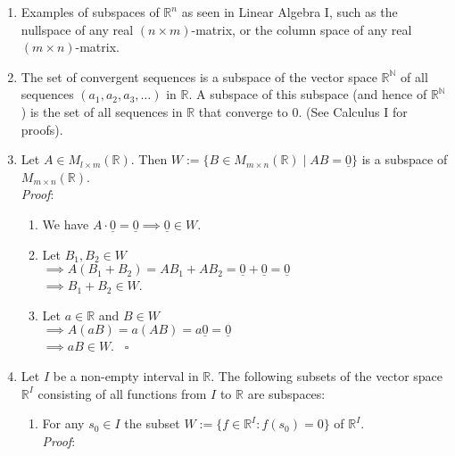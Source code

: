 \documentclass[
  12pt,
  a4paper,
  twoside]{article}
\providecommand{\tightlist}{%
  \setlength{\itemsep}{0pt}\setlength{\parskip}{0pt}}
\theoremstyle{plain}
\theoremstyle{definition}
\begin{document}
\begin{enumerate}
\def\labelenumi{(\alph{enumi})}
\item
  Examples of subspaces of \(\mathbb{R}^{n}\) as seen in Linear Algebra I, such as the nullspace of any real \((n \times m)\)-matrix, or the column space of any real \((m\times n)\)-matrix.
\item
  The set of convergent sequences is a subspace of the vector space \(\mathbb{R}^{\mathbb{N}}\) of all sequences \((a_{1},a_{2},a_{3}, \dots)\) in \(\mathbb{R}\). A subspace of this subspace (and hence of \(\mathbb{R}^{\mathbb{N}}\)) is the set of all sequences in \(\mathbb{R}\) that converge to \(0\). (See Calculus I for proofs).
\item
  Let \(A \in M_{l \times m}(\mathbb{R})\). Then \(W := \{B \in M_{m \times n}(\mathbb{R}) \mid AB = \underline{0} \}\) is a subspace of \(M_{m \times n}(\mathbb{R})\).\\
  \emph{Proof}:

  \begin{enumerate}
  \def\labelenumii{(\roman{enumii})}
  \tightlist
  \item
    We have \(A \cdot \underline{0} = \underline{0} \implies \underline{0} \in W\).
  \item
    Let \(B_{1},B_{2} \in W\)\\
    \(\implies A(B_{1} + B_{2}) = AB_{1} + AB_{2} = \underline{0} + \underline{0} = \underline{0}\)\\
    \(\implies B_{1} + B_{2} \in W\).
  \item
    Let \(a \in \mathbb{R}\) and \(B \in W\)\\
    \(\implies A(aB) = a(AB) = a \underline{0} = \underline{0}\)\\
    \(\implies aB \in W\). \hfill~{\(\square\)}
  \end{enumerate}
\item
  Let \(I\) be a non-empty interval in \(\mathbb{R}\). The following subsets of the vector space \(\mathbb{R}^{I}\) consisting of all functions from \(I\) to \(\mathbb{R}\) are subspaces:

  \begin{enumerate}
  \def\labelenumii{(\roman{enumii})}
  \tightlist
  \item
    For any \(s_{0} \in I\) the subset \(W := \{ f \in \mathbb{R}^{I} : f(s_{0})=0 \}\) of \(\mathbb{R}^{I}\).\\
    \emph{Proof}:


\end{enumerate}
\end{enumerate}
\end{document}
